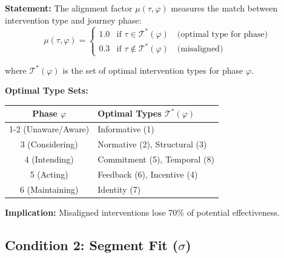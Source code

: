 \begin{tcolorbox}[colback=gray!5!white, colframe=gray!75!black,
    title=EIH Condition 1: Journey Alignment (from HHH Axiom HHH-3)]

\textbf{Statement:} The alignment factor $\mu(\tau, \varphi)$ measures the match
between intervention type and journey phase:
\begin{equation}
\mu(\tau, \varphi) = \begin{cases}
1.0 & \text{if } \tau \in \mathcal{T}^*(\varphi) \quad \text{(optimal type for phase)} \\
0.3 & \text{if } \tau \notin \mathcal{T}^*(\varphi) \quad \text{(misaligned)}
\end{cases}
\label{eq:mu-alignment}
\end{equation}

where $\mathcal{T}^*(\varphi)$ is the set of optimal intervention types for phase $\varphi$.

\textbf{Optimal Type Sets:}
\begin{center}
\renewcommand{\arraystretch}{1.2}
\begin{tabular}{@{}cl@{}}
\toprule
\textbf{Phase $\varphi$} & \textbf{Optimal Types $\mathcal{T}^*(\varphi)$} \\
\midrule
1-2 (Unaware/Aware) & Informative (1) \\
3 (Considering) & Normative (2), Structural (3) \\
4 (Intending) & Commitment (5), Temporal (8) \\
5 (Acting) & Feedback (6), Incentive (4) \\
6 (Maintaining) & Identity (7) \\
\bottomrule
\end{tabular}
\end{center}

\textbf{Implication:} Misaligned interventions lose 70\% of potential effectiveness.
\end{tcolorbox}

\subsection{Condition 2: Segment Fit ($\sigma$)}

